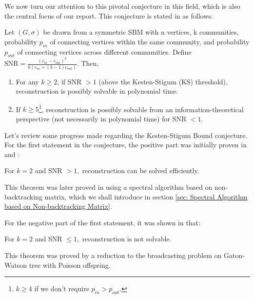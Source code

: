 We now turn our attention to this pivotal conjecture in this field, which is also the central focus of our report. This conjecture is stated in \cite{TheConjecture} as follows:
\begin{conjecture}\label{Conj}
    Let $(G, \sigma)$ be drawn from a symmetric SBM with n vertices, k communities, probability $p_{in}$ of connecting vertices within the same community, and probability $p_{out}$ of connecting vertices across different communities. Define $\text{SNR} = \frac{(c_{in}-c_{out})^2}{k(c_{in}+(k-1)c_{out})}.$ Then,
\begin{enumerate}
    \item For any \(k \geq 2\), if SNR \(> 1\) (above the Kesten-Stigum (KS) threshold), reconstruction is possibly solvable in polynomial time.
    \item If \(k \geq 5\)\footnote{$k\geq4$ if we don't require $p_{in}>p_{out}.$},  reconstruction is possibly solvable from an information-theoretical perspective (not necessarily in polynomial time) for SNR $<1$.
\end{enumerate}
\end{conjecture}
Let's review some progress made regarding the Kesten-Stigum Bound conjecture. For the first statement in the conjecture, the positive part was initially proven in \cite{mas14} and \cite{mns14b}:
\begin{theorem}\label{thm:1.1.1}
    For $k=2$ and SNR $>1,$ reconstruction can be solved efficiently.
\end{theorem}
\begin{remark}
    This theorem was later proved in \cite{blm15} using a spectral algorithm based on non-backtracking matrix, which we shall introduce in section \ref{sec: Spectral Algorithm based on Non-backtracking Matrix}.
\end{remark}
For the negative part of the first statement, it was shown in \cite{mns15} that:
\begin{theorem}\label{thm:1.1.2}
    For $k=2$ and SNR $\leq1,$ reconstruction is not solvable.
\end{theorem}
\begin{remark}
    This theorem was proved by a reduction to the broadcasting problem on Gaton-Watson tree with Poisson offspring.
\end{remark}

